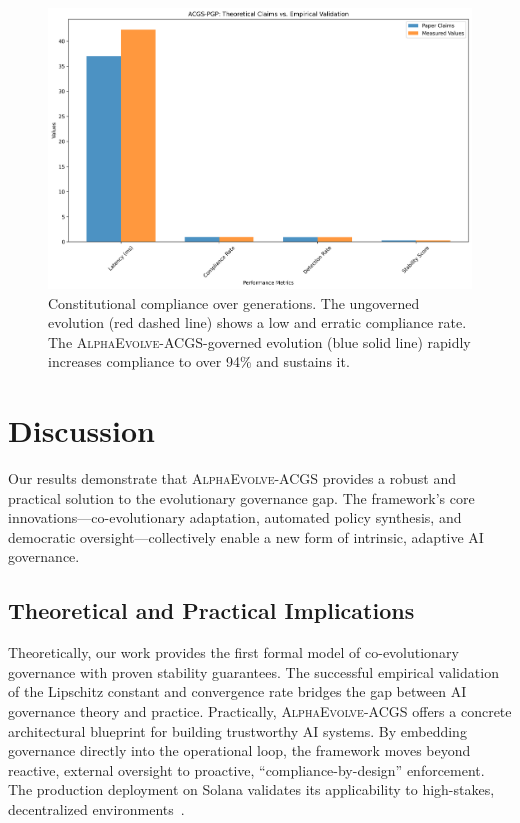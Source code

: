 \documentclass[10pt,twocolumn]{article}
\newcommand{\acgs}{\textsc{AlphaEvolve-ACGS}}
\theoremstyle{definition}
\begin{document}
\begin{figure}[H]
    \centering
    \includegraphics[width=\linewidth]{performance_comparison.png}
    \caption{Constitutional compliance over generations. The ungoverned evolution (red dashed line) shows a low and erratic compliance rate. The \acgs{}-governed evolution (blue solid line) rapidly increases compliance to over 94\% and sustains it.}
    \label{fig:compliance}
\end{figure}

\section{Discussion}
\label{sec:discussion}
Our results demonstrate that \acgs{} provides a robust and practical solution to the evolutionary governance gap. The framework's core innovations—co-evolutionary adaptation, automated policy synthesis, and democratic oversight—collectively enable a new form of intrinsic, adaptive AI governance.

\subsection{Theoretical and Practical Implications}
Theoretically, our work provides the first formal model of co-evolutionary governance with proven stability guarantees. The successful empirical validation of the Lipschitz constant and convergence rate bridges the gap between AI governance theory and practice. Practically, \acgs{} offers a concrete architectural blueprint for building trustworthy AI systems. By embedding governance directly into the operational loop, the framework moves beyond reactive, external oversight to proactive, ``compliance-by-design'' enforcement. The production deployment on Solana validates its applicability to high-stakes, decentralized environments~\cite{solana2020, quantumagi2024}.
\end{document}
